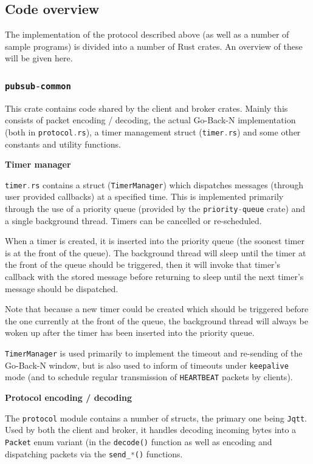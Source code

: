 \documentclass[a4paper]{article}
\numberwithin{figure}{section}
\numberwithin{table}{section}
\newcommand{\mi}{\mintinline}
\begin{document}
\subsection{Code overview}
The implementation of the protocol described above (as well as a number of sample programs) is divided into a number of Rust crates. An overview of these will be given here.

\subsubsection{\mi{c}{pubsub-common}}
This crate contains code shared by the client and broker crates. Mainly this consists of packet encoding / decoding, the actual Go-Back-N implementation (both in \mi{c}{protocol.rs}), a timer management struct (\mi{c}{timer.rs}) and some other constants and utility functions.

\medskip
\noindent \textbf{Timer manager}

\smallskip
\noindent \mi{c}{timer.rs} contains a struct (\mi{rust}{TimerManager}) which dispatches messages (through user provided callbacks) at a specified time. This is implemented primarily through the use of a priority queue (provided by the \mi{rust}{priority-queue} crate) and a single background thread. Timers can be cancelled or re-scheduled.

When a timer is created, it is inserted into the priority queue (the soonest timer is at the front of the queue). The background thread will sleep until the timer at the front of the queue should be triggered, then it will invoke that timer's callback with the stored message before returning to sleep until the next timer's message should be dispatched.

Note that because a new timer could be created which should be triggered before the one currently at the front of the queue, the background thread will always be woken up after the timer has been inserted into the priority queue.

\mi{rust}{TimerManager} is used primarily to implement the timeout and re-sending of the Go-Back-N window, but is also used to inform of timeouts under \mi{c}{keepalive} mode (and to schedule regular transmission of \mi{c}{HEARTBEAT} packets by clients).

\medskip
\noindent \textbf{Protocol encoding / decoding}

\smallskip
\noindent The \mi{rust}{protocol} module contains a number of structs, the primary one being \mi{rust}{Jqtt}. Used by both the client and broker, it handles decoding incoming bytes into a \mi{c}{Packet} enum variant (in the \mi{rust}{decode()} function as well as encoding and dispatching packets via the \mi{rust}{send_*()} functions.
\end{document}
